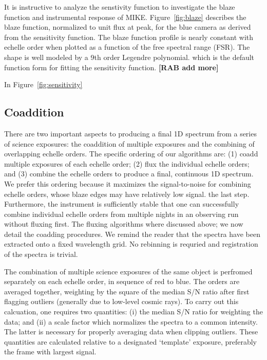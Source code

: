 \documentclass[12pt,preprint]{aastex}
\begin{document}
It is instructive to analyze the senstivity function to 
investigate the blaze function and instrumental response
of MIKE.  Figure~\ref{fig:blaze} describes the blaze function,
normalized to unit flux at peak, for the blue camera as
derived from the sensitivity function.  The blaze function
profile is nearly constant with echelle order when plotted
as a function of the free spectral range (FSR).  The shape
is well modeled by a 9th order Legendre polynomial.
which is the default function form for fitting the sensitivity
function. {\bf [RAB add more]}

In Figure~\ref{fig:sensitivity}

\subsection{Coaddition}

There are two important aspects to producing a final 1D
spectrum from a series of science exposures:
the coaddition of multiple exposures and the combining 
of overlapping echelle orders.
The specific ordering of our algorithms are:
(1) coadd multiple exposures of each echelle order;
(2) flux the individual echelle orders;
and (3) combine the echelle orders to produce a final, continuous
1D spectrum.
We prefer this ordering because it maximizes the signal-to-noise 
for combining echelle orders, whose blaze edges may have relatively
low signal.
the last step.  Furthermore, the instrument is sufficiently
stable that one can successfully combine individual echelle
orders from multiple nights in an observing run without fluxing first.
The fluxing algorithms where discussed above;
we now detail the coadding procedures.
We remind the reader that the spectra have been extracted onto
a fixed wavelength grid.  No rebinning is requried and registration
of the spectra is trivial.

The combination of multiple science exposures of the same object
is perfromed separately on each echelle order, in sequence of
red to blue.  The orders are averaged together, weighting by the square
of the median S/N ratio after first flagging outliers 
(generally due to low-level cosmic rays).
To carry out this calcuation, one requires two quantities:
(i) the median S/N ratio for weighting the data; and
(ii) a scale factor which normalizes the spectra to a common
intensity.  The latter is necessary for properly averaging 
data when clipping outliers.
These quantities are calculated relative to a designated `template' 
exposure, preferably the frame with largest signal.
\end{document}
